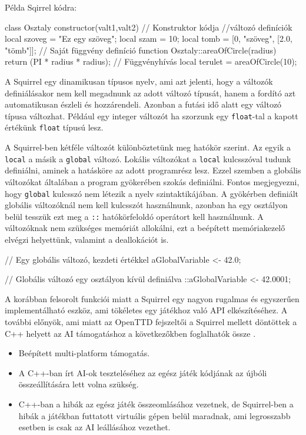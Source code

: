 Példa Sqirrel kódra:
\begin{cpp}
class Osztaly
{
  constructor(valt1,valt2)
  {
    // Konstruktor kódja
  }
  //változó definíciók
  local szoveg = "Ez egy szöveg";
  local szam = 10;
  local tomb = [0, "szöveg", [2.0, "tömb"]];
}
// Saját függvény definíció
function Osztaly::areaOfCircle(radius) {
  return (PI * radius * radius);
}
// Függvényhívás
local terulet = areaOfCircle(10);
\end{cpp}

A Squirrel egy dinamikusan típusos nyelv, ami azt jelenti, hogy a változók definiálásakor nem kell megadnunk az adott változó típusát, hanem a fordító azt automatikusan észleli és hozzárendeli. Azonban a futási idő alatt egy változó típusa változhat. Például egy integer változót ha szorzunk egy \texttt{float}-tal a kapott értékünk \texttt{float} típusú lesz.

A Squirrel-ben kétféle változót különböztetünk meg hatókör szerint. Az egyik a \texttt{local} a másik a \texttt{global} változó. Lokális változókat a \texttt{local} kulcsszóval tudunk definiálni, aminek a hatásköre az adott programrész lesz. Ezzel szemben a globális változókat általában a program gyökerében szokás definiálni. Fontos megjegyezni, hogy \texttt{global} kulcsszó nem létezik a nyelv szintaktikájában. A gyökérben definiált globális változóknál nem kell kulcsszót használnunk, azonban ha egy osztályon belül tesszük ezt meg a \texttt{::} hatókörfeloldó operátort kell használnunk. A változóknak nem szükséges memóriát allokálni, ezt a beépített memóriakezelő elvégzi helyettünk, valamint a deallokációt is.

\begin{cpp}
// Egy globális változó, kezdeti értékkel
aGlobalVariable <- 42.0;

// Globális változó egy osztályon kívül definiálva
::aGlobalVariable <- 42.0001;
\end{cpp}

A korábban felsorolt funkciói miatt a Squirrel egy nagyon rugalmas és egyszerűen implementálható eszköz, ami tökéletes egy játékhoz való API elkészítéséhez. A további előnyök, ami miatt az OpenTTD fejszeltői a Squirrel mellett döntöttek a C++ helyett az AI támogatáshoz a következőkben foglalhatók össze \cite{wisniewski2011artificial}.
\begin{itemize}
	\item Beépített multi-platform támogatás.
	\item A C++-ban írt AI-ok teszteléséhez az egész játék kódjának az újbóli összeállítására lett volna szükség.
	\item C++-ban a hibák az egész játék összeomlásához vezetnek, de Squirrel-ben a hibák a játékban futtatott virtuális gépen belül maradnak, ami legrosszabb esetben is csak az AI leállásához vezethet.
\end{itemize}

